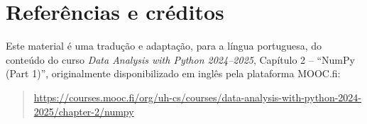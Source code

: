 \documentclass[11pt,a4paper]{article}
\begin{document}
\section*{Referências e créditos}

Este material é uma tradução e adaptação, para a língua portuguesa, do
conteúdo do curso \emph{Data Analysis with Python 2024--2025}, Capítulo
2 -- ``NumPy (Part 1)'', originalmente disponibilizado em inglês pela
plataforma MOOC.fi:

\begin{quote}
\url{https://courses.mooc.fi/org/uh-cs/courses/data-analysis-with-python-2024-2025/chapter-2/numpy}
\end{quote}
\end{document}
